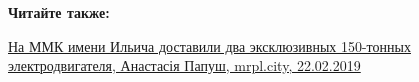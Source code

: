 
\textbf{Читайте также:} 

\href{https://mrpl.city/news/view/na-mmk-imeni-ilicha-dostavili-dva-e-ksklyuzivnyh-150-tonnyh-e-lektrodvigatelya-foto}{%
На ММК имени Ильича доставили два эксклюзивных 150-тонных электродвигателя, Анастасія Папуш, mrpl.city, 22.02.2019}
